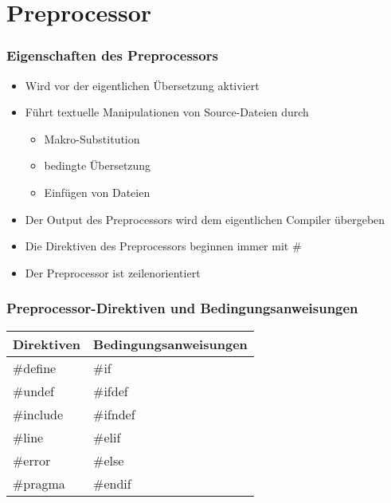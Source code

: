 
\part{Preprocessor}
\label{sec:Preprocessor}

\section{Eigenschaften des Preprocessors}
\label{sec:Eigenschaften des Preprocessors}
\begin{itemize}
	\item Wird vor der eigentlichen Übersetzung aktiviert
	\item Führt textuelle Manipulationen von Source-Dateien durch
	\begin{itemize}
		\item Makro-Substitution
		\item bedingte Übersetzung
		\item Einfügen von Dateien
	\end{itemize}
	\item Der Output des Preprocessors wird dem eigentlichen Compiler übergeben
	\item Die Direktiven des Preprocessors beginnen immer mit \#
	\item Der Preprocessor ist zeilenorientiert
\end{itemize}

\section{Preprocessor-Direktiven und Bedingungsanweisungen}
\label{sec:Preprocessor-Direktiven und Bedingungsanweisungen}
\centering
\begin{tabularx}{0.5\textwidth}{|X|X|}
	\hline
	\textbf{Direktiven} & \textbf{Bedingungsanweisungen}\\
	\hline
	\#define & \#if\\
	\hline
	\#undef & \#ifdef\\
	\hline
	\#include & \#ifndef\\
	\hline
	\#line & \#elif\\
	\hline
	\#error & \#else\\
	\hline
	\#pragma & \#endif\\
	\hline
\end{tabularx}
\flushleft


